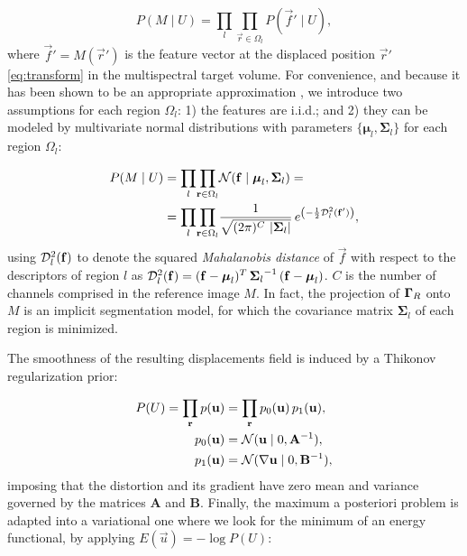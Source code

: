   \begin{equation}
  P(M \mid U) = \underset{l}{\prod} \underset{\vec{r}\in \Omega_l}{\prod}
    P\left( \vec{f}' \mid U \right),
  \label{eq:bayes_aposteriori}
  \end{equation}
%
  where $\vec{f}' = M(\vec{r}')$ is the feature vector at the displaced
  position $\vec{r}'$ \eqref{eq:transform} in the multispectral target
  volume.
For convenience, and because it has been shown to be an appropriate approximation
  \citep{leemput_automated_1999,cuadra_comparison_2005}, we introduce two assumptions for each
  region $\Omega_l$:
  1) the features are i.i.d.; and 2) they can be modeled by multivariate normal
  distributions with parameters $\lbrace \boldsymbol{\mu}_l, \boldsymbol{\Sigma}_{l} \rbrace$
  for each region $\Omega_l$:

 	\begin{align}
  P( M \mid U) &= \underset{l}{\prod} \underset{\vec{r} \in \Omega_l}{\prod}
  \mathcal{N} ( \vec{f} \mid \boldsymbol{\mu}_l, \boldsymbol{\Sigma}_{l} ) = \notag\\
  &= \underset{l}{\prod} \underset{\vec{r} \in \Omega_l}{\prod} \frac{1}{ \sqrt{(2\pi)^{C}\,\left|\boldsymbol{\Sigma}_{l}\right|}}\,{e^{\left(-\frac{1}{2}
  \mdist{f'}{l} \right)}},
  \label{eq:pdf}
  \end{align}
%
  using $\mdist{f}{l}$ to denote the squared \emph{Mahalanobis distance} of $\vec{f}$ with respect
  to the descriptors of region $l$ as
  $\mdist{f}{l} = (\vec{f} - \boldsymbol{\mu}_l)^T \, {\boldsymbol{\Sigma}_l}^{-1} \, (\vec{f} - \boldsymbol{\mu}_l)$.
$C$ is the number of channels comprised in the reference image $M$.
In fact, the projection of $\gammaset_R$ onto $M$ is an implicit segmentation model, for which
  the covariance matrix $\boldsymbol{\Sigma}_l$ of each region is minimized.

The smoothness of the resulting displacements field is induced by a Thikonov regularization
  prior:

  \begin{align}
  P(U) = \underset{\vec{r}}{\prod}\, p(\vec{u}) &=
  \underset{\vec{r}}{\prod}\, p_0(\vec{u}) \, p_1(\vec{u}), \\
  p_0(\vec{u}) &= \mathcal{N}( \vec{u} \mid 0, \mathbf{A}^{-1}), \notag\\
  p_1(\vec{u}) &= \mathcal{N}(  \nabla \vec{u} \mid 0, \mathbf{B}^{-1}),
  \label{eq:thikonov}
  \end{align}
%
  imposing that the distortion and its gradient have zero
  mean and variance governed by the matrices $\mathbf{A}$ and $\mathbf{B}$.
Finally, the maximum a posteriori problem is adapted into a variational one where we look for
  the minimum of an energy functional, by applying $E(\vec{u}) = -\log P(U)$:

